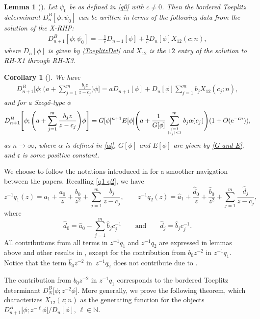 \documentclass[pdftex]{sigma}
\numberwithin{equation}{section}
\newtheorem{Corollary}[Theorem]{Corollary}
\newtheorem{Lemma}[Theorem]{Lemma}
 { \theoremstyle{definition}
\newtheorem{Definition}[Theorem]{Definition}
\newtheorem{Example}[Theorem]{Example}
\newtheorem{Remark}[Theorem]{Remark}
\newtheorem{Question}[Theorem]{Question}
}
\newcommand{\N}{{\mathbb N}}
\newcommand{\al}{\alpha}
\newcommand{\di}{\displaystyle}
\newcommand{\qandq}{\qquad \text{and} \qquad}
\begin{document}
	\begin{Lemma}[\cite{BEGIL}]\label{lem2.2} Let $\psi_0$ be as defined in \eqref{q0} with $c \neq 0$. Then the bordered Toeplitz determinant $D^{B}_n[\phi;\psi_0]$ can be written in terms of the following data from the solution of the X-RHP:
		\begin{gather*}%
			D^{B}_{n+1}[\phi;\psi_0] = - \frac{1}{c}D_{n+1}[\phi]+ \frac{1}{c} D_{n}[\phi] X_{12}(c;n),
		\end{gather*}
		where $D_{n}[\phi]$ is given by \eqref{ToeplitzDet} and $X_{12}$ is the $12$ entry of the solution to {\rm RH-X1} through {\rm RH-X3}.
	\end{Lemma}
	\begin{Corollary}[\cite{BEGIL}]\label{cor 2}
		We have
		\begin{gather*}%
			D^B_{n+1}\Bigg[\phi;\di\Bigg( a+\sum^{m}_{j=1}\frac{b_j z}{z-c_j}\Bigg)\phi \Bigg] =aD_{n+1}[\phi]+ D_n[\phi] \sum^{m}_{j=1}b_j X_{12}(c_j;n),
		\end{gather*}
		and for a Szeg\H{o}-type $\phi$
		\begin{gather*}%
			D^B_{n+1}\Bigg[\phi;\di\Bigg( a+\sum^{m}_{j=1}\frac{b_j z}{z-c_j}\Bigg)\phi \Bigg] = G[\phi]^{n+1} E[\phi] \Bigg(a+\frac{1}{G[\phi]}\sum^{m}_{j=1 \atop |c_j|<1 }b_j \al(c_j)\Bigg)( 1 + O({\rm e}^{-\mathfrak{c}n})),
		\end{gather*}
		as $n \to \infty$, where $\al$ is defined in \eqref{al}, $G[\phi]$ and $E[\phi]$ are given by \eqref{G and E}, and $\mathfrak{c}$ is some positive constant.
	\end{Corollary}
	
	We choose to follow the notations introduced in \cite{BEGIL} for a smoother navigation between the papers. Recalling \eqref{q1 q2}, we have
	\[ 	z^{-1}q_1(z) = a_1+ \frac{a_0}{z} +\frac{b_0}{z^2}+\sum^{m}_{j=1}\frac{b_j}{z-c_j}, \qquad z^{-1}q_2(z) = \hat{a}_1 + \frac{\hat{d}_0 }{z}+\frac{\hat{b}_0}{z^2}+%
	\sum_{j=1}^m \frac{\hat{d}_j}{z-c_j}, \]
	where
	\[ \hat{d}_0 = \hat{a}_0 - \sum_{j=1}^{m} \hat{b}_jc^{-1}_j \qandq \hat{d}_j = \hat{b}_jc^{-1}_j. \]
	All contributions from all terms in $z^{-1}q_1$ and $z^{-1}q_2$ are expressed in lemmas above and other results in \cite{BEGIL}, except for the contribution from $b_0z^{-2}$ in $z^{-1}q_1$. Notice that the term $\hat{b}_0z^{-2}$ in~$z^{-1}q_2$ does not contribute due to \cite[Lemma 2.1]{BEGIL}.
	
The contribution from $b_0z^{-2}$ in $z^{-1}q_1$ corresponds to the bordered Toeplitz determinant $D^{B}_N\big[\phi;z^{-2}\phi\big]$. More generally, we prove the following theorem, which characterizes $X_{12}(z;n)$ as the generating function for the objects $D^B_{n+1}\big[\phi;z^{-\ell}\phi\big]/D_n[\phi]$, $\ell \in \N$.
	
\end{document}
